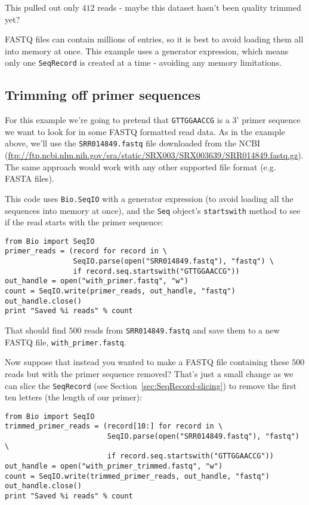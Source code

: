 \documentclass{report}
\begin{document}
\noindent This pulled out only $412$ reads - maybe this dataset hasn't been
quality trimmed yet?

FASTQ files can contain millions of entries, so it is best to avoid loading
them all into memory at once.  This example uses a generator expression, which
means only one \verb|SeqRecord| is created at a time - avoiding any memory
limitations.

\subsection{Trimming off primer sequences}
\label{sec:FASTQ-slicing-off-primer}

For this example we're going to pretend that \texttt{GTTGGAACCG} is a 3' primer
sequence we want to look for in some FASTQ formatted read data.  As in the example
above, we'll use the \texttt{SRR014849.fastq} file downloaded from the NCBI
(\url{ftp://ftp.ncbi.nlm.nih.gov/sra/static/SRX003/SRX003639/SRR014849.fastq.gz}).
The same approach would work with any other supported file format (e.g. FASTA files).

This code uses \verb|Bio.SeqIO| with a generator expression (to avoid loading
all the sequences into memory at once), and the \verb|Seq| object's
\verb|startswith| method to see if the read starts with the primer sequence:

\begin{verbatim}
from Bio import SeqIO
primer_reads = (record for record in \
                SeqIO.parse(open("SRR014849.fastq"), "fastq") \
                if record.seq.startswith("GTTGGAACCG"))
out_handle = open("with_primer.fastq", "w")
count = SeqIO.write(primer_reads, out_handle, "fastq")
out_handle.close()
print "Saved %i reads" % count
\end{verbatim}

\noindent That should find $500$ reads from \texttt{SRR014849.fastq} and save them to
a new FASTQ file, \texttt{with\_primer.fastq}.

Now suppose that instead you wanted to make a FASTQ file containing these $500$ reads
but with the primer sequence removed?  That's just a small change as we can slice the
\verb|SeqRecord| (see Section~\ref{sec:SeqRecord-slicing}) to remove the first ten
letters (the length of our primer):

\begin{verbatim}
from Bio import SeqIO
trimmed_primer_reads = (record[10:] for record in \
                        SeqIO.parse(open("SRR014849.fastq"), "fastq") \
                        if record.seq.startswith("GTTGGAACCG"))
out_handle = open("with_primer_trimmed.fastq", "w")
count = SeqIO.write(trimmed_primer_reads, out_handle, "fastq")
out_handle.close()
print "Saved %i reads" % count
\end{verbatim}
\end{document}
